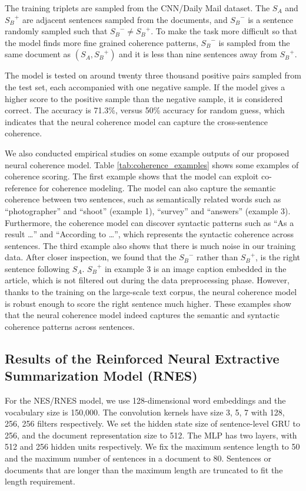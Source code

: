 	The training triplets are sampled from the CNN/Daily Mail dataset. The $S_A$ and ${S_B}^{+}$ are adjacent sentences sampled from the documents, and ${S_B}^{-}$ is a sentence randomly sampled such that ${S_B}^{-} \neq {S_B}^{+}$. To make the task more difficult so that the model finds more fine grained coherence patterns, ${S_B}^{-}$ is sampled from the same document as $(S_A, {S_B}^{+})$ and it is less than nine sentences away from ${S_B}^{+}$.

	The model is tested on around twenty three thousand positive pairs sampled from the test set, each accompanied with one negative sample. If the model gives a higher score to the positive sample than the negative sample, it is considered correct. The accuracy is 71.3\%, versus 50\% accuracy for random guess, which indicates that the neural coherence model can capture the cross-sentence coherence.

	We also conducted empirical studies on some example outputs of our proposed neural coherence model. Table \ref{tab:coherence_examples} shows some examples of coherence scoring. The first example shows that the model can exploit co-reference for coherence modeling. The model can also capture the semantic coherence between two sentences, such as semantically related words such as ``photographer'' and ``shoot'' (example 1), ``survey'' and ``answers'' (example 3). Furthermore, the coherence model can discover syntactic patterns such as ``As a result \dots'' and ``According to \dots'', which represents the syntactic coherence across sentences. The third example also shows that there is much noise in our training data. After closer inspection, we found that the ${S_B}^{-}$ rather than ${S_B}^{+}$, is the right sentence following ${S_A}$. ${S_B}^{+}$ in example 3 is an image caption embedded in the article, which is not filtered out during the data preprocessing phase. However, thanks to the training on the large-scale text corpus, the neural coherence model is robust enough to score the right sentence much higher. These examples show that the neural coherence model indeed captures the semantic and syntactic coherence patterns across sentences.

	\subsection{Results of the Reinforced Neural Extractive Summarization Model (RNES)} For the NES/RNES model, we use 128-dimensional word embeddings and the vocabulary size is 150,000. The convolution kernels have size 3, 5, 7 with 128, 256, 256 filters respectively. We set the hidden state size of sentence-level GRU to 256, and the document representation size to 512. The MLP has two layers, with 512 and 256 hidden units respectively. We fix the maximum sentence length to 50 and the maximum number of sentences in a document to 80. Sentences or documents that are longer than the maximum length are truncated to fit the length requirement.

